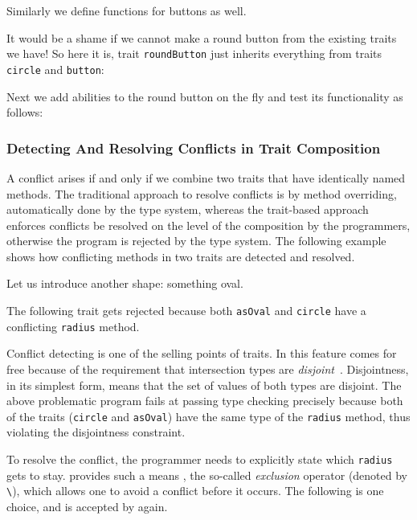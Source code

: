 Similarly we define functions for buttons as well.

It would be a shame if we cannot make a round button from the existing traits we
have! So here it is, trait \lstinline{roundButton} just inherits everything from
traits \lstinline{circle} and \lstinline{button}:

Next we add abilities to the round button on the fly and test its functionality
as follows:



\subsubsection{Detecting And Resolving Conflicts in Trait Composition}
\label{sec:conflicts}

A conflict arises if and only if we combine two traits that have identically
named methods. The traditional approach to resolve conflicts is by method
overriding, automatically done by the type system, whereas the trait-based
approach enforces conflicts be resolved on the level of the composition by the
programmers, otherwise the program is rejected by the type system. The following
example shows how conflicting methods in two traits are detected and resolved.

Let us introduce another shape: something oval.

The following trait gets rejected because both \lstinline{asOval} and
\lstinline{circle} have a conflicting \lstinline{radius} method.

Conflict detecting is one of the selling points of traits. In \name this feature
comes for free because of the requirement that intersection types are
\textit{disjoint}~\cite{oliveira2016disjoint}. Disjointness, in its simplest
form, means that the set of values of both types are disjoint. The above
problematic program fails at passing type checking precisely because both of the
traits (\lstinline{circle} and \lstinline{asOval}) have the same type of the
\lstinline{radius} method, thus violating the disjointness constraint.

To resolve the conflict, the programmer needs to explicitly state which
\lstinline{radius} gets to stay. \name provides such a means , the so-called
\textit{exclusion} operator (denoted by \lstinline{\}), which allows one to
avoid a conflict before it occurs. The following is one choice, and is accepted
by \name again.



